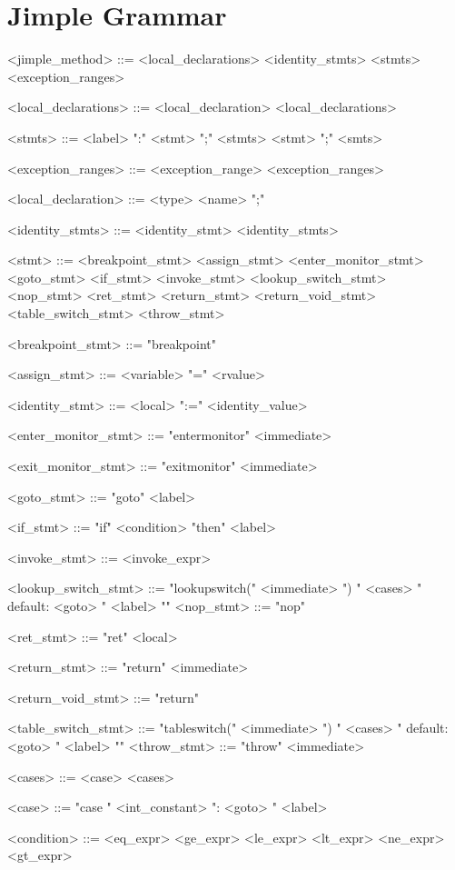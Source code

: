 \documentclass{report}
\begin{document}
\section{Jimple Grammar}
\begin{grammar}
<jimple_method> ::= <local_declarations> <identity_stmts> <stmts> <exception_ranges>

<local_declarations> ::= <local_declaration> <local_declarations>

<stmts> ::= <label> ":" <stmt> ";" <stmts> \alt  <stmt> ";" <smts>

<exception_ranges> ::= <exception_range> <exception_ranges>

<local_declaration> ::= <type> <name> ";"

<identity_stmts> ::= <identity_stmt> <identity_stmts>

<stmt> ::= <breakpoint_stmt> \alt <assign_stmt> \alt <enter_monitor_stmt>
<goto_stmt> \alt <if_stmt> \alt <invoke_stmt> \alt <lookup_switch_stmt> \alt <nop_stmt> \alt <ret_stmt> \alt <return_stmt> \alt <return_void_stmt> \alt <table_switch_stmt> \alt <throw_stmt>

<breakpoint_stmt> ::= "breakpoint"

<assign_stmt> ::= <variable> "=" <rvalue>

<identity_stmt> ::= <local> ":=" <identity_value>

<enter_monitor_stmt> ::= "entermonitor" <immediate>

<exit_monitor_stmt> ::= "exitmonitor" <immediate>

<goto_stmt> ::= "goto" <label>

<if_stmt> ::= "if" <condition> "then" <label>

<invoke_stmt> ::= <invoke_expr>

<lookup_switch_stmt> ::= "lookupswitch(" <immediate> ") {" <cases> " default: <goto> " <label> "}" <nop_stmt> ::= "nop"

<ret_stmt> ::= "ret" <local>

<return_stmt> ::= "return" <immediate>

<return_void_stmt> ::= "return" 

<table_switch_stmt> ::= "tableswitch(" <immediate> ") {" <cases> " default: <goto> " <label> "}" <throw_stmt> ::= "throw" <immediate>

<cases> ::= <case> <cases>

<case> ::= "case " <int_constant> ": <goto> " <label>

<condition> ::= <eq_expr> \alt <ge_expr> \alt <le_expr> \alt <lt_expr> \alt <ne_expr> \alt <gt_expr>


\end{grammar}
\end{document}
